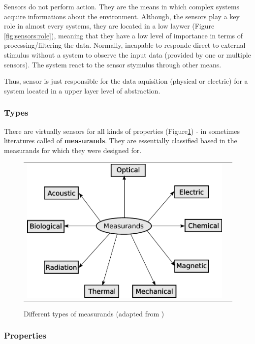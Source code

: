 Sensors do not perform action. They are the means in which complex systems acquire informations about the environment. Although, the sensors play a key role in almost every systems, they are located in a low laywer (Figure \ref{fig:sensors:role}), meaning that they have a low level of importance in terms of processing/filtering the data. Normally, incapable to responde direct to external stimulus without a system to observe the input data (provided by one or multiple sensors). The system react to the sensor stymulus through other means.

Thus, sensor is just responsible for the data aquisition (physical or electric) for a system located in a upper layer level of abstraction.

\subsubsection{Types}

There are virtually sensors for all kinds of properties (Figure\ref{fig:sensors}) - in sometimes literatures called of \textbf{measurands}. They are essentially classified based in the measurands for which they were designed for.

\begin{figure}[h]
   \centering
     \begin{tabular}{lr}
       \includegraphics[scale=0.50]{img/fig:sensors}
     \end{tabular}
   \caption{Different types of measurands (adapted from \cite{WhiteRichard})}
   \label{fig:sensors}
 \end{figure}

\subsubsection{Properties}

